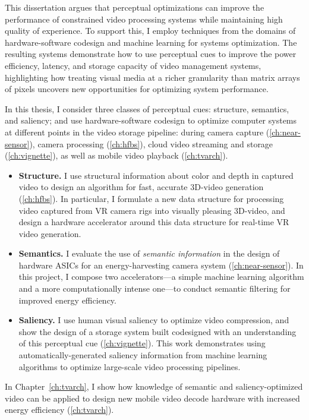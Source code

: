 This dissertation argues that perceptual optimizations can improve the performance of constrained video processing systems while maintaining high quality of experience.
To support this, I employ techniques from the domains of hardware-software codesign and machine learning for systems optimization.
The resulting systems demonstrate how to use perceptual cues to improve the power efficiency, latency, and storage capacity of video management systems, highlighting how treating visual media at a richer granularity than matrix arrays of pixels uncovers new opportunities for optimizing system performance.

In this thesis, I consider three classes of perceptual cues: structure, semantics, and saliency; and use hardware-software codesign to optimize computer systems at different points in the video storage pipeline: during camera capture (\ref{ch:near-sensor}), camera processing (\ref{ch:hfbs}), cloud video streaming and storage (\ref{ch:vignette}), as well as mobile video playback (\ref{ch:tvarch}).

\begin{itemize}
\item \textbf{Structure.} I use structural information about color and depth in captured video to design an algorithm for fast, accurate 3D-\threesixty video generation (\ref{ch:hfbs}).
In particular, I formulate a new data structure for processing video captured from VR camera rigs into visually pleasing 3D-\threesixty video, and design a hardware accelerator around this data structure for real-time VR video generation.

\item \textbf{Semantics.} I evaluate the use of \emph{semantic information} in the design of hardware ASICs for an energy-harvesting camera system (\ref{ch:near-sensor}).
In this project, I compose two accelerators---a simple machine learning algorithm and a more computationally intense one---to conduct semantic filtering for improved energy efficiency.

\item \textbf{Saliency.} I use human visual saliency to optimize video compression, and show the design of a storage system built codesigned with an understanding of this perceptual cue (\ref{ch:vignette}).
This work demonstrates using automatically-generated saliency information from machine learning algorithms to optimize large-scale video processing pipelines.
\end{itemize}

In Chapter~\ref{ch:tvarch}, I show how knowledge of semantic and saliency-optimized video can be applied to design new mobile video decode hardware with increased energy efficiency (\ref{ch:tvarch}).

